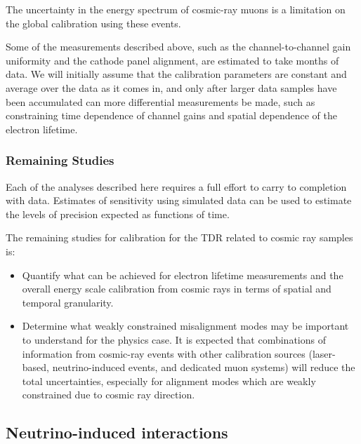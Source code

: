 The uncertainty in the energy spectrum of cosmic-ray muons is a limitation on the global 
calibration using these events.

Some of the measurements described above, such as the channel-to-channel gain uniformity and the
cathode panel alignment, are estimated to take months of data.  We will initially assume that
the calibration parameters are constant and average over the data as it comes in, and only after
larger data samples have been accumulated can more differential measurements be made, such as
constraining time dependence of channel gains and spatial dependence of the electron lifetime.

\subsubsection{Remaining Studies}

Each of the analyses described here requires a full effort to carry to completion with data.
Estimates of sensitivity using simulated data can be used to estimate the levels of precision expected
as functions of time.  

The remaining studies for calibration for the TDR related to cosmic ray samples is:
\begin{itemize}
\item Quantify what can be achieved for  electron lifetime measurements and the overall energy scale calibration from cosmic rays in terms of spatial and temporal granularity.
\item Determine what weakly constrained misalignment modes may be important to understand for the physics case. It is expected that combinations of information from cosmic-ray events with other calibration sources (laser-based, neutrino-induced events, and dedicated muon systems) will reduce the total uncertainties, especially for alignment modes which are weakly constrained due to cosmic ray direction. 
\end{itemize}



\subsection{Neutrino-induced interactions }\label{sec:nuinduced}

